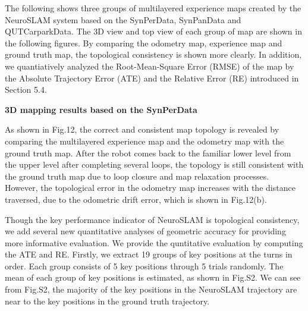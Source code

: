 The following shows three groups of multilayered experience maps created by the NeuroSLAM system based on the SynPerData, SynPanData and QUTCarparkData.
The 3D view and top view of each group of map are shown in the following figures.
By comparing the odometry map, experience map and ground truth map, the topological consistency is shown more clearly.
In addition, we quantiatively analyzed the Root-Mean-Square Error (RMSE) of the map by the Absolute Trajectory Error (ATE) and the Relative Error (RE) introduced in Section 5.4.


\noindent \textbf{3D mapping results based on the SynPerData}

As shown in Fig.12, the correct and consistent map topology is revealed by comparing the multilayered experience map and the odometry map with the ground truth map.
After the robot comes back to the familiar lower level from the upper level after completing several loops, the topology is still consistent with the ground truth map due to loop closure and map relaxation processes.
However, the topological error in the odometry map increases with the distance traversed, due to the odometric drift error, which is shown in Fig.12(b).


Though the key performance indicator of NeuroSLAM is topological consistency, we add several new quantitative analyses of geometric accuracy for providing more informative evaluation.
We provide the quntitative evaluation by computing the ATE and RE.
Firstly, we extract 19 groups of key positions at the turns in order.
Each group consists of 5 key positions through 5 trials randomly.
The mean of each group of key positions is estimated, as shown in Fig.S2.
We can see from Fig.S2, the majority of the key positions in the NeuroSLAM trajectory are near to the key positions in the ground truth trajectory.


